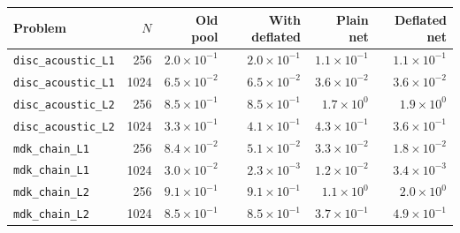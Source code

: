 \begin{tabular}{lrrrrr}
\toprule
Problem & $N$ & Old pool & With deflated & Plain net & Deflated net \\
\midrule
\texttt{disc\_acoustic\_L1} & 256 & $2.0\times10^{-1}$ & $2.0\times10^{-1}$ & $1.1\times10^{-1}$ & $1.1\times10^{-1}$ \\
\texttt{disc\_acoustic\_L1} & 1024 & $6.5\times10^{-2}$ & $6.5\times10^{-2}$ & $3.6\times10^{-2}$ & $3.6\times10^{-2}$ \\
\texttt{disc\_acoustic\_L2} & 256 & $8.5\times10^{-1}$ & $8.5\times10^{-1}$ & $1.7\times10^{0}$ & $1.9\times10^{0}$ \\
\texttt{disc\_acoustic\_L2} & 1024 & $3.3\times10^{-1}$ & $4.1\times10^{-1}$ & $4.3\times10^{-1}$ & $3.6\times10^{-1}$ \\
\texttt{mdk\_chain\_L1} & 256 & $8.4\times10^{-2}$ & $5.1\times10^{-2}$ & $3.3\times10^{-2}$ & $1.8\times10^{-2}$ \\
\texttt{mdk\_chain\_L1} & 1024 & $3.0\times10^{-2}$ & $2.3\times10^{-3}$ & $1.2\times10^{-2}$ & $3.4\times10^{-3}$ \\
\texttt{mdk\_chain\_L2} & 256 & $9.1\times10^{-1}$ & $9.1\times10^{-1}$ & $1.1\times10^{0}$ & $2.0\times10^{0}$ \\
\texttt{mdk\_chain\_L2} & 1024 & $8.5\times10^{-1}$ & $8.5\times10^{-1}$ & $3.7\times10^{-1}$ & $4.9\times10^{-1}$ \\
\bottomrule
\end{tabular}
